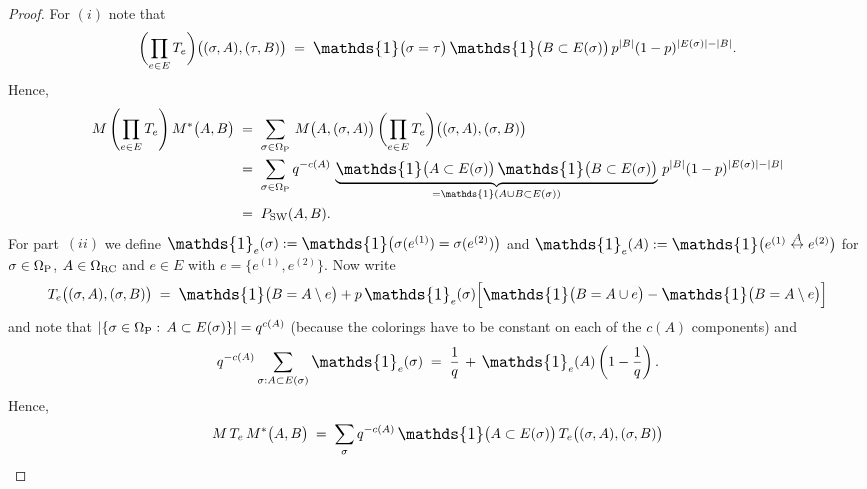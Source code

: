 \documentclass{dis}
\theoremstyle{citing}
\begin{document}
\begin{proof}
For $(i)$ note that
\[
\biggl(\prod\limits_{e\in E} T_e\biggr)\bigl((\sigma,A),(\tau,B)\bigr) 
	\;=\; {\scalebox{1.2}{\raisebox{-0.2mm}{$\mathds{1}$}}}\bigl(\sigma=\tau\bigr)\,{\scalebox{1.2}{\raisebox{-0.2mm}{$\mathds{1}$}}}\bigl(B\subset E(\sigma)\bigr)\,
	p^{{\left\vert {B} \right\vert}}(1-p)^{{\left\vert {E(\sigma)} \right\vert}-{\left\vert {B} \right\vert}}.
\]
Hence,
\[\begin{split}
M \left(\prod\limits_{e\in E} T_e\right) M^*\bigl(A,B\bigr) 
\;&=\; \sum_{\sigma\in{{\Omega}_{\rm P}}}\, M\bigl(A,(\sigma,A)\bigr)\,
	\biggl(\prod\limits_{e\in E} T_e\biggr)\bigl((\sigma,A),(\sigma,B)\bigr)\\
&=\; \sum_{\sigma\in{{\Omega}_{\rm P}}} q^{-c(A)}\,
		\underbrace{{\scalebox{1.2}{\raisebox{-0.2mm}{$\mathds{1}$}}}\bigl(A\subset E(\sigma)\bigr)\,
				{\scalebox{1.2}{\raisebox{-0.2mm}{$\mathds{1}$}}}\bigl(B\subset E(\sigma)\bigr)}_{
				=\mathds{1}(A\cup B\subset E(\sigma))}\,
		
		p^{{\left\vert {B} \right\vert}}(1-p)^{{\left\vert {E(\sigma)} \right\vert}-{\left\vert {B} \right\vert}}\\
&=\; P_{\rm SW}(A,B).
\end{split}\]
For part~$(ii)$ we define 
${\scalebox{1.2}{\raisebox{-0.2mm}{$\mathds{1}$}}}_e(\sigma):={\scalebox{1.2}{\raisebox{-0.2mm}{$\mathds{1}$}}}\bigl(\sigma(e^{(1)})=\sigma(e^{(2)})\bigr)$ and 
${\scalebox{1.2}{\raisebox{-0.2mm}{$\mathds{1}$}}}_e(A):={\scalebox{1.2}{\raisebox{-0.2mm}{$\mathds{1}$}}}\bigl(e^{(1)}\stackrel{A}{\leftrightarrow}e^{(2)}\bigr)$ 
for $\sigma\in{\Omega}_{\rm P}$, $A\in{\Omega}_{\rm RC}$ and $e\in E$ with 
$e=\{e^{(1)},e^{(2)}\}$.
Now write 
\[
T_e\bigl((\sigma,A),(\sigma,B)\bigr) \;=\;
{\scalebox{1.2}{\raisebox{-0.2mm}{$\mathds{1}$}}}\bigl(B=A\setminus e\bigr) + p\,{\scalebox{1.2}{\raisebox{-0.2mm}{$\mathds{1}$}}}_e(\sigma)
\Bigl[{\scalebox{1.2}{\raisebox{-0.2mm}{$\mathds{1}$}}}\bigl(B=A\cup e\bigr)
-{\scalebox{1.2}{\raisebox{-0.2mm}{$\mathds{1}$}}}\bigl(B=A\setminus e\bigr)\Bigr]
\]
and note that ${\left\vert {\{\sigma\in{{\Omega}_{\rm P}}:\, A\subset E(\sigma)\}} \right\vert}=q^{c(A)}$ 
(because the colorings have to be constant on each of the $c(A)$ 
components) and
\[
q^{-c(A)}\sum_{\sigma: A\subset E(\sigma)}{\scalebox{1.2}{\raisebox{-0.2mm}{$\mathds{1}$}}}_e(\sigma) 
\;=\; \frac1q \,+\, {\scalebox{1.2}{\raisebox{-0.2mm}{$\mathds{1}$}}}_e(A)\left(1-\frac1q\right).
\]
Hence,
\[\begin{split}
M\,T_e\,M^*\bigl(A,B\bigr) 
\;&=\; \sum_{\sigma} q^{-c(A)}\,{\scalebox{1.2}{\raisebox{-0.2mm}{$\mathds{1}$}}}\bigl(A\subset E(\sigma)\bigr)\,
				T_e\bigl((\sigma,A),(\sigma,B)\bigr)\\
		

\end{split}\]
\end{proof}
\end{document}

